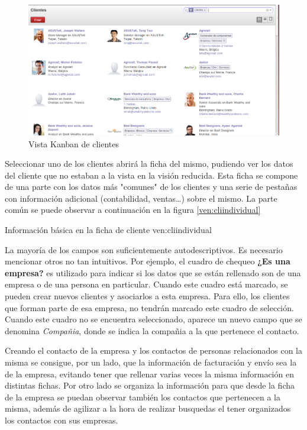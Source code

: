 \begin{figure}[H]
\includegraphics[width=\textwidth]{ventas/img/ven_clikanban.png}
\caption{Vista Kanban de clientes}
\label{ven:clikanban}
\end{figure}

Seleccionar uno de los clientes abrirá la ficha del mismo, pudiendo ver los datos del 
cliente que no estaban a la vista en la visión reducida. Esta ficha se compone de una
parte con los datos más "comunes" de los clientes y una serie de pestañas con información
adicional (contabilidad, ventas\ldots) sobre el mismo. La parte común se puede observar a
continuación en la figura \ref{ven:cliindividual}

{Información básica en la ficha de cliente}
{ven:cliindividual}


La mayoría de los campos son suficientemente autodescriptivos. Es necesario
mencionar otros no tan intuitivos. Por ejemplo, el cuadro de chequeo \textbf{¿Es una empresa?}
es utilizado para indicar si los datos que se están rellenado son de una empresa o 
de una persona en particular. Cuando este cuadro está marcado, se pueden crear nuevos
clientes y asociarlos a esta empresa. Para ello, los clientes que forman parte de esa
empresa, no tendrán marcado este cuadro de selección. Cuando este cuadro no se encuentra
seleccionado, aparece un nuevo campo que se denomina \emph{Compañia}, donde se indica
la compañia a la que pertenece el contacto.

Creando el contacto de la empresa y los contactos de personas relacionados con la misma
se consigue, por un lado, que la información de facturación y envío sea la de la empresa, 
evitando tener que rellenar varias veces la misma información en distintas fichas. Por otro
lado se organiza la información para que desde la ficha de la empresa se puedan observar también
los contactos que pertenecen a la misma, además de agilizar a la hora de realizar busquedas
el tener organizados los contactos con sus empresas.


